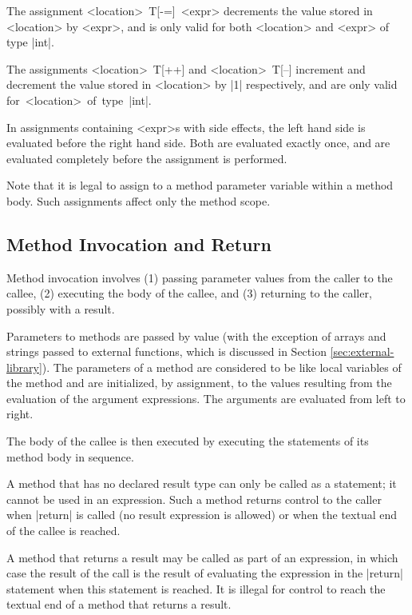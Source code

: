 \documentclass[11pt]{article}
\begin{document}
The assignment {\bnf <location>~T[-=]~<expr>} decrements the value stored in {\bnf <location>} by {\bnf <expr>}, and is only valid for both {\bnf <location>} and {\bnf <expr>} of type \decaf|int|.

The assignments {\bnf <location>~T[++]} and {\bnf <location>~T[--]} increment and decrement the value stored in {\bnf <location>} by \decaf|1| respectively, and are only valid for~{\bnf <location>}~of~type~\decaf|int|.


In assignments containing {\bnf <expr>}s with side effects, the left hand side is evaluated before the right hand side.
Both are evaluated exactly once, and are evaluated completely before the assignment is performed.

Note that it is legal to assign to a method parameter variable within a method body.
Such assignments affect only the method scope.

\subsection{Method Invocation and Return}

Method invocation involves (1) passing parameter values from the caller to the callee, (2) executing the body of the callee, and (3) returning to the caller, possibly with a result.

Parameters to methods are passed by value (with the exception of arrays and strings passed to external functions, which is discussed in Section \ref{sec:external-library}).
The parameters of a method are considered to be like local variables of the method and are initialized, by assignment, to the values resulting from the evaluation of the argument expressions.
The arguments are evaluated from left to right.

The body of the callee is then executed by executing the statements of its method body in sequence.

A method that has no declared result type can only be called as a statement; it cannot be used in an expression.
Such a method returns control to the caller when \decaf|return| is called (no result expression is allowed) or when the textual end of the callee is reached.

A method that returns a result may be called as part of an expression, in which case the result of the call is the result of evaluating the expression in the \decaf|return| statement when this statement is reached.
It is illegal for control to reach the textual end of a method that returns a result.
\end{document}
